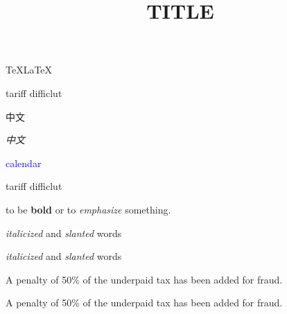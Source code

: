 ﻿\documentclass[a4paper]{article}
\title{TITLE}
\author{}
\date{}
\begin{document}
\TeX \LaTeX

tariff difficlut

中文

{\it 中文}

\textcolor{blue}{calendar}

{\sf tariff difficlut}

to be {\bf bold} or to {\sl emphasize} something.

{\it italicized\/} and {\sl slanted\/} words

{\it italicized} and {\sl slanted} words

\def\cheater{A penalty of 50\% of the underpaid tax
has been added for fraud.\par}

\cheater\cheater
\end{document}
